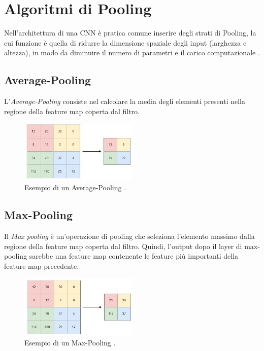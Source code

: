 \newpage
\section{Algoritmi di Pooling}
Nell’architettura di una CNN è pratica comune inserire degli strati di Pooling, 
la cui funzione è quella di ridurre la dimensione
spaziale degli input (larghezza e altezza), in modo da diminuire il numero di parametri e
il carico computazionale \cite{ELEMENTI_CNN_1, ELEMENTI_CNN_2, ELEMENTI_CNN_3} . 

\subsection{Average-Pooling}

L'\textit{Average-Pooling} consiste nel calcolare la 
media degli elementi presenti nella regione della feature map coperta dal filtro. 
\begin{figure}[H]
    \centering
    \includegraphics[width=0.5\textwidth]{Immagini/Generiche/avgPool.png}
    \caption{Esempio di un Average-Pooling \cite{PULLING}.}
    \label{fig:avgPool}
\end{figure}

\subsection{Max-Pooling}
Il \textit{Max pooling} è un'operazione di pooling che seleziona l'elemento 
massimo dalla regione della feature map coperta dal filtro. Quindi, 
l'output dopo il layer di max-pooling sarebbe una feature map 
contenente le feature più importanti della feature map precedente.

\begin{figure}[H]
    \centering
    \includegraphics[width=0.5\textwidth]{Immagini/Generiche/maxPool.png}
    \caption{Esempio di un Max-Pooling \cite{PULLING}.}
    \label{fig:maxPool}
\end{figure}

